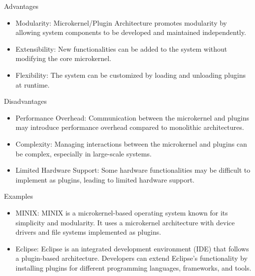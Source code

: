 \documentclass[aspectratio=169, table]{beamer}
\begin{document}
	\begin{frame}{Advantages}
		\begin{itemize}
			\item Modularity: Microkernel/Plugin Architecture promotes modularity by allowing system components to be developed and maintained independently.
			\item Extensibility: New functionalities can be added to the system without modifying the core microkernel.
			\item Flexibility: The system can be customized by loading and unloading plugins at runtime.
		\end{itemize}
	\end{frame}
	
	\begin{frame}{Disadvantages}
		\begin{itemize}
			\item Performance Overhead: Communication between the microkernel and plugins may introduce performance overhead compared to monolithic architectures.
			\item Complexity: Managing interactions between the microkernel and plugins can be complex, especially in large-scale systems.
			\item Limited Hardware Support: Some hardware functionalities may be difficult to implement as plugins, leading to limited hardware support.
		\end{itemize}
	\end{frame}
	
	\begin{frame}{Examples}
		\begin{itemize}
			\item MINIX: MINIX is a microkernel-based operating system known for its simplicity and modularity. It uses a microkernel architecture with device drivers and file systems implemented as plugins.
			\item Eclipse: Eclipse is an integrated development environment (IDE) that follows a plugin-based architecture. Developers can extend Eclipse's functionality by installing plugins for different programming languages, frameworks, and tools.
		\end{itemize}
	\end{frame}
	
\end{document}
